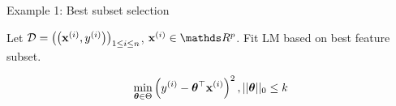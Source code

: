 \documentclass[11pt,compress,t,notes=noshow, xcolor=table]{beamer}
\begin{document}
\begin{frame2}{Example 1: Best subset selection}














Let {\footnotesize $\mathcal{D} = \left(\left(\mathbf{x}^{(i)}, y^{(i)}\right)\right)_{1 \le i \le n}$, $\xi \in \R^p$}. Fit LM based on best feature subset.

$$
\min_{\bm{\theta} \in \Theta} \left(y^{(i)} - \bm{\theta}^\top \mathbf{x}^{(i)}\right)^2, ||\bm{\theta}||_{0} \leq k
$$


\end{frame2}
\end{document}
